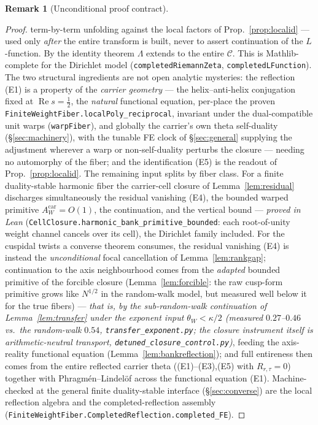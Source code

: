 \documentclass[11pt]{article}
\theoremstyle{definition}
\newtheorem{remark}[theorem]{Remark}
\renewcommand{\Re}{\operatorname{Re}}
\begin{document}
\begin{remark}[Unconditional proof contract]
\begin{enumerate}
\begin{proof}
term-by-term unfolding against the local factors of Prop.~\ref{prop:localid} --- used only \emph{after} the
entire transform is built, never to assert continuation of the $L$-function. By the identity theorem
$\Lambda$ extends to the entire $\mathcal C$. This is Mathlib-complete for the Dirichlet model
(\texttt{completedRiemannZeta}, \texttt{completedLFunction}). The two structural ingredients are not open
analytic mysteries: the reflection \textup{(E1)} is a property of the \emph{carrier geometry} --- the
helix--anti-helix conjugation fixed at $\Re s=\tfrac12$, the \emph{natural} functional equation, per-place
the proven \texttt{FiniteWeightFiber.localPoly\_reciprocal}, invariant under the dual-compatible unit warps
(\texttt{warpFiber}), and globally the carrier's own theta self-duality (\S\ref{sec:machinery}), with the
tunable FE clock of \S\ref{sec:general} supplying the adjustment wherever a warp or non-self-duality
perturbs the closure --- needing no automorphy of the fiber; and the identification \textup{(E5)} is the
readout of Prop.~\ref{prop:localid}. The remaining input splits by fiber class. For a finite duality-stable
harmonic fiber the carrier-cell closure of Lemma~\ref{lem:residual} discharges simultaneously the residual
vanishing \textup{(E4)}, the bounded warped primitive $A^{\mathrm{car}}_W=O(1)$, the continuation, and the
vertical bound --- \emph{proved in Lean} (\texttt{CellClosure.harmonic\_bank\_primitive\_bounded}: each
root-of-unity weight channel cancels over its cell), the Dirichlet family included. For the cuspidal twists a
converse theorem consumes, the residual vanishing \textup{(E4)} is instead the \emph{unconditional} focal
cancellation of Lemma~\ref{lem:rankgap}; continuation to the axis neighbourhood comes from the \emph{adapted}
bounded primitive of the forcible closure (Lemma~\ref{lem:forcible}: the raw cusp-form primitive grows like
$N^{1/2}$ in the random-walk model, but measured well below it for the true fibers) --- \emph{that is, by the
sub-random-walk continuation of Lemma~\ref{lem:transfer} under the exponent input $\theta_W<\kappa/2$
(measured $0.27$--$0.46$ vs.\ the random-walk $0.54$, \texttt{transfer\_exponent.py}; the closure instrument
itself is arithmetic-neutral transport, \texttt{detuned\_closure\_control.py})}, feeding the axis-reality
functional equation (Lemma~\ref{lem:bankreflection}); and full entireness then comes from the entire reflected carrier theta
(\textup{(E1)--(E3),(E5)} with $R_{r,\tau}=0$) together with Phragm\'en--Lindel\"of across the functional
equation \textup{(E1)}. Machine-checked at the general finite
duality-stable interface (\S\ref{sec:converse}) are the local reflection algebra and the
completed-reflection assembly (\texttt{FiniteWeightFiber.CompletedReflection.completed\_FE}).
\end{proof}


\end{enumerate}
\end{remark}
\end{document}
